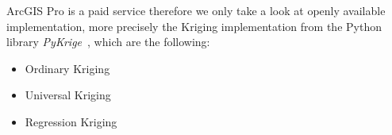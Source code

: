 ArcGIS Pro is a paid service therefore we only take a look at openly available implementation, more precisely the Kriging implementation from the Python library \textit{PyKrige}~\cite{benjamin_murphy_2022_7008206}, which are the following:

\begin{itemize}
    \item Ordinary Kriging
    \item Universal Kriging
    \item Regression Kriging
\end{itemize}
